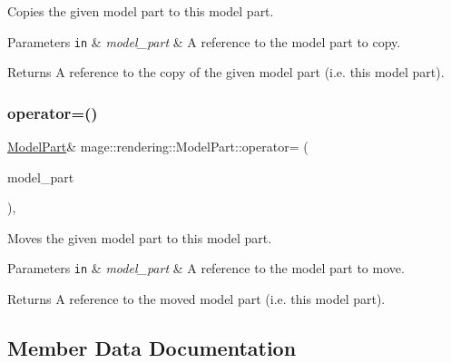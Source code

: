 Copies the given model part to this model part.


\begin{DoxyParams}[1]{Parameters}
\mbox{\tt in}  & {\em model\+\_\+part} & A reference to the model part to copy. \\
\hline
\end{DoxyParams}
\begin{DoxyReturn}{Returns}
A reference to the copy of the given model part (i.\+e. this model part). 
\end{DoxyReturn}
\hypertarget{structmage_1_1rendering_1_1_model_part_a54950b40fa5dd12e77277669cbd6dc3a}{}\label{structmage_1_1rendering_1_1_model_part_a54950b40fa5dd12e77277669cbd6dc3a} 
\subsubsection{\texorpdfstring{operator=()}{operator=()}\hspace{0.1cm}{\footnotesize\ttfamily [2/2]}}
{\footnotesize\ttfamily \hyperlink{structmage_1_1rendering_1_1_model_part}{Model\+Part}\& mage\+::rendering\+::\+Model\+Part\+::operator= (\begin{DoxyParamCaption}\item[{\hyperlink{structmage_1_1rendering_1_1_model_part}{Model\+Part} \&\&}]{model\+\_\+part }\end{DoxyParamCaption})\hspace{0.3cm}{\ttfamily [default]}, {\ttfamily [noexcept]}}

Moves the given model part to this model part.


\begin{DoxyParams}[1]{Parameters}
\mbox{\tt in}  & {\em model\+\_\+part} & A reference to the model part to move. \\
\hline
\end{DoxyParams}
\begin{DoxyReturn}{Returns}
A reference to the moved model part (i.\+e. this model part). 
\end{DoxyReturn}


\subsection{Member Data Documentation}
\hypertarget{structmage_1_1rendering_1_1_model_part_a69f7f90a31e48a286fecebc9e680b5ef}{}\label{structmage_1_1rendering_1_1_model_part_a69f7f90a31e48a286fecebc9e680b5ef} 
